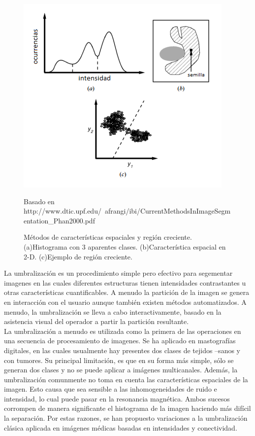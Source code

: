 \documentclass[12pt]{report}
\begin{document}
\begin{figure}[H]
\centering
\includegraphics[width = 10 cm, height = 10 cm]{umbral}
\caption{Métodos de características espaciales y región creciente. (a)Histograma con 3 aparentes clases. (b)Característica espacial en 2-D. (c)Ejemplo de región creciente.}
Basado en http://www.dtic.upf.edu/~afrangi/ibi/CurrentMethodsInImageSegmentation_Phan2000.pdf
\end{figure}

La umbralización es un procedimiento simple pero efectivo para segementar imagenes en las cuales diferentes estructuras tienen intensidades contrastantes u otras características cuantificables. A menudo la partición de la imagen se genera en interacción con el usuario aunque también existen métodos automatizados. A menudo, la umbralización se lleva a cabo interactivamente, basado en la asistencia visual del operador a partir la partición resultante.\\

La umbralización a menudo es utilizada como la primera de las operaciones en una secuencia de procesamiento de imagenes. Se ha aplicado en mastografías digitales, en las cuales usualmente hay presentes dos clases de tejidos --sanos y con tumores. Su principal limitación, es que en su forma más simple, sólo se generan dos clases y no se puede aplicar a imágenes multicanales. Además, la umbralización comunmente no toma en cuenta las características espaciales de la imagen. Esto causa que sea sensible a las inhomogeneidades de ruido e intensidad, lo cual puede pasar en la resonancia magnética. Ambos sucesos corrompen de manera significante el histograma de la imagen haciendo más difícil la separación. Por estas razones, se han propuesto variaciones a la umbralización clásica aplicada en imágenes médicas basadas en intensidades y conectividad. \cite{metodos}
\end{document}
